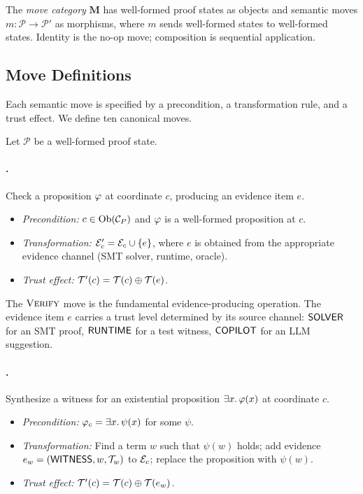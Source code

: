 \begin{definition}\label{def:move-cat}
The \emph{move category} $\mathbf{M}$ has well-formed proof states as
objects and semantic moves $m : \mathcal{P} \to \mathcal{P}'$ as
morphisms, where $m$ sends well-formed states to well-formed states.
Identity is the no-op move; composition is sequential application.
\end{definition}

\subsection{Move Definitions}\label{sec:move-defs}

Each semantic move is specified by a precondition, a transformation
rule, and a trust effect.  We define ten canonical moves.

\begin{definition}\label{def:canonical-moves}
Let $\mathcal{P}$ be a well-formed proof state.
\end{definition}

\paragraph{\VERIFY.}
Check a proposition $\varphi$ at coordinate $c$, producing an evidence
item $e$.
\begin{itemize}[nosep]
  \item \emph{Precondition:} $c \in \mathrm{Ob}(\mathcal{C}_P)$ and $\varphi$
        is a well-formed proposition at $c$.
  \item \emph{Transformation:}
        $\mathcal{E}'_c = \mathcal{E}_c \cup \{e\}$, where $e$ is obtained from
        the appropriate evidence channel (SMT solver, runtime, oracle).
  \item \emph{Trust effect:}
        $\mathcal{T}'(c) = \mathcal{T}(c) \oplus \mathcal{T}(e)$.
\end{itemize}
The $\textsc{Verify}$ move is the fundamental evidence-producing operation.
The evidence item $e$ carries a trust level determined by its
source channel: $\mathsf{SOLVER}$ for an SMT proof, $\mathsf{RUNTIME}$ for a
test witness, $\mathsf{COPILOT}$ for an LLM suggestion.

\paragraph{\CONSTRUCT.}
Synthesize a witness for an existential proposition
$\exists x.\, \varphi(x)$ at coordinate $c$.
\begin{itemize}[nosep]
  \item \emph{Precondition:}
        $\varphi_c = \exists x.\, \psi(x)$ for some $\psi$.
  \item \emph{Transformation:}
        Find a term $w$ such that $\psi(w)$ holds; add evidence
        $e_w = (\mathsf{WITNESS}, w, \mathcal{T}_w)$ to $\mathcal{E}_c$;
        replace the proposition with $\psi(w)$.
  \item \emph{Trust effect:} $\mathcal{T}'(c) = \mathcal{T}(c) \oplus \mathcal{T}(e_w)$.
\end{itemize}

